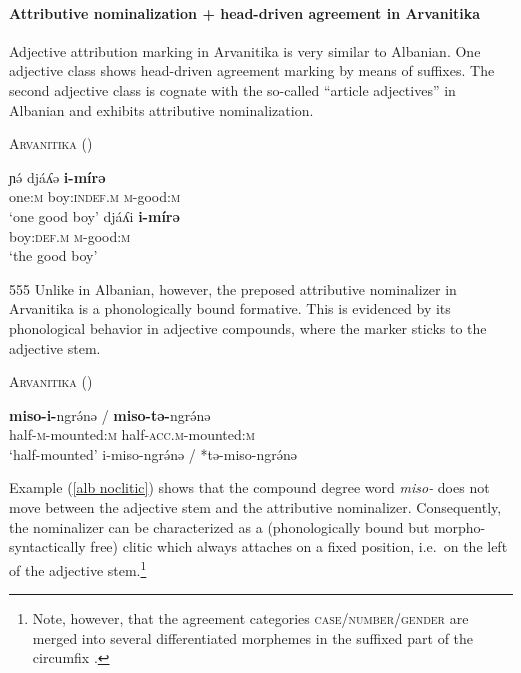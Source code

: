 \paragraph{Attributive nominalization + head-driven agreement in Arvanitika}
Adjective attribution marking in Arvanitika is very similar to Albanian. One adjective class shows head-driven agreement marking by means of suffixes. The second adjective class is cognate with the so-called “article adjectives” in Albanian and exhibits attributive nominalization. 
\begin{exe}
\ex \textsc{Arvanitika} (\citealt[303]{sasse1991})
\begin{xlist}
\ex
\gll	ɲə́ 			djáʎə 			\textbf{i-mírə}\\
	one:\textsc{m} 	boy:\textsc{indef.m} 	\textsc{m}-good:\textsc{m}\\
\glt	‘one good boy’
\ex
\gll				djáʎi 				\textbf{i-mírə}\\
				boy:\textsc{def.m} 	\textsc{m}-good:\textsc{m}\\
\glt	‘the good boy’
\end{xlist}
\end{exe}
555
Unlike in Albanian, however, the preposed attributive nominalizer in Arvanitika is a phonologically bound formative. This is evidenced by its phonological behavior in adjective compounds, where the marker sticks to the adjective stem.
\begin{exe}
\ex \textsc{Arvanitika} (\citealt[304]{sasse1991}) \label{alb noclitic}
\begin{xlist}
\ex
\gll	\textbf{miso-i-}ngrə́nə / \textbf{miso-tə-}ngrə́nə\\
	half-\textsc{m}-mounted:\textsc{m} { } half-\textsc{acc.m}-mounted:\textsc{m}\\
\glt	‘half-mounted’
\ex	*i-miso-ngrə́nə / *tə-miso-ngrə́nə
\end{xlist}
\end{exe}
Example (\ref{alb noclitic}) shows that the compound degree word {\it miso-} does not move between the adjective stem and the attributive nominalizer. Consequently, the nominalizer can be characterized as a (phonologically bound but morpho-syntactically free) clitic which always attaches on a fixed position, i.e.~on the left of the adjective stem.\footnote{Note, however, that the agreement categories \textsc{case/number/gender} are merged into several differentiated morphemes in the suffixed part of the circumfix \cite[124–128]{sasse1991}.}

